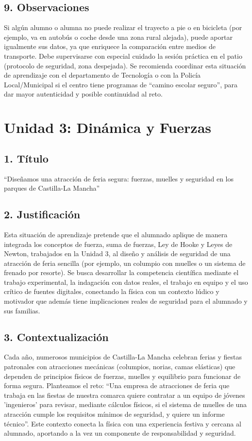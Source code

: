 \documentclass[11pt,a4paper]{article}
\begin{document}
\subsection*{9. Observaciones}
Si algún alumno o alumna no puede realizar el trayecto a pie o en bicicleta (por ejemplo, va en autobús o coche desde una zona rural alejada), puede aportar igualmente sus datos, ya que enriquece la comparación entre medios de transporte. Debe supervisarse con especial cuidado la sesión práctica en el patio (protocolo de seguridad, zona despejada). Se recomienda coordinar esta situación de aprendizaje con el departamento de Tecnología o con la Policía Local/Municipal si el centro tiene programas de ``camino escolar seguro'', para dar mayor autenticidad y posible continuidad al reto.

\newpage
\section{Unidad 3: Dinámica y Fuerzas}
\subsection*{1. Título}
``Diseñamos una atracción de feria segura: fuerzas, muelles y seguridad en los parques de Castilla-La Mancha''

\subsection*{2. Justificación}
Esta situación de aprendizaje pretende que el alumnado aplique de manera integrada los conceptos de fuerza, suma de fuerzas, Ley de Hooke y Leyes de Newton, trabajados en la Unidad 3, al diseño y análisis de seguridad de una atracción de feria sencilla (por ejemplo, un columpio con muelles o un sistema de frenado por resorte). Se busca desarrollar la competencia científica mediante el trabajo experimental, la indagación con datos reales, el trabajo en equipo y el uso crítico de fuentes digitales, conectando la física con un contexto lúdico y motivador que además tiene implicaciones reales de seguridad para el alumnado y sus familias.

\subsection*{3. Contextualización}
Cada año, numerosos municipios de Castilla-La Mancha celebran ferias y fiestas patronales con atracciones mecánicas (columpios, norias, camas elásticas) que dependen de principios físicos de fuerzas, muelles y equilibrio para funcionar de forma segura. Planteamos el reto: ``Una empresa de atracciones de feria que trabaja en las fiestas de nuestra comarca quiere contratar a un equipo de jóvenes 'ingenieros' para revisar, mediante cálculos físicos, si el sistema de muelles de una atracción cumple los requisitos mínimos de seguridad, y quiere un informe técnico''. Este contexto conecta la física con una experiencia festiva y cercana al alumnado, aportando a la vez un componente de responsabilidad y seguridad.
\end{document}

